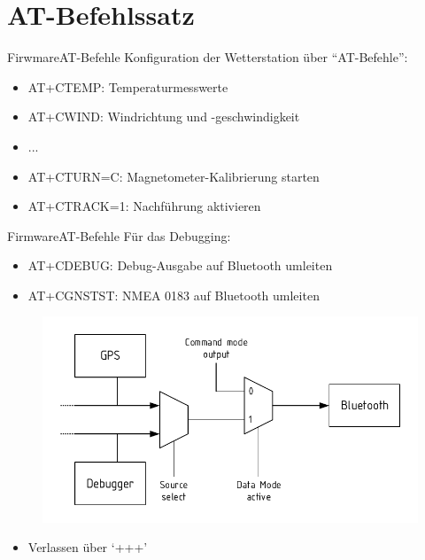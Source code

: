 \documentclass{beamer}
\begin{document}
\section{AT-Befehlssatz}
\begin{frame}{Firwmare}{AT-Befehle}
    Konfiguration der Wetterstation über ``AT-Befehle'':
    \begin{itemize}
        \item AT+CTEMP: Temperaturmesswerte
        \item AT+CWIND: Windrichtung und -geschwindigkeit
        \item ...
        \item AT+CTURN=C: Magnetometer-Kalibrierung starten
        \item AT+CTRACK=1: Nachführung aktivieren
    \end{itemize}
\end{frame}

\begin{frame}{Firmware}{AT-Befehle}
    Für das Debugging:
    \begin{itemize}
        \item AT+CDEBUG: Debug-Ausgabe auf Bluetooth umleiten
        \item AT+CGNSTST: NMEA 0183 auf Bluetooth umleiten
    \end{itemize}
    \begin{figure}[H]
        \centering
        \includegraphics[width=.8\textwidth]{./img/Datenpfad_BT.pdf}
    \end{figure}
    \begin{itemize}
        \item Verlassen über `+++' 
    \end{itemize}
\end{frame}
\end{document}
